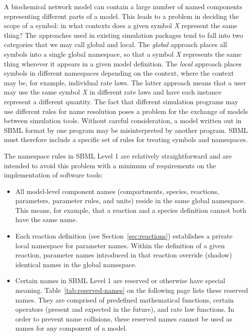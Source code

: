 \documentclass[10pt]{cekarticle}
\newcommand{\changed}[1]{\textcolor{BrickRed}{#1}}
\begin{document}
A biochemical network model can contain a large number of named components
representing different parts of a model.  This leads to a problem in
deciding the scope of a symbol: in what contexts does a given symbol
\emph{X} represent the same thing?  The approaches used in existing
simulation packages tend to fall into two categories that we may call
global and local.  The \emph{global} approach places all symbols into a
single global namespace, so that a symbol \emph{X} represents the same
thing wherever it appears in a given model definition.  The \emph{local}
approach places symbols in different namespaces depending on the context,
where the context may be, for example, individual rate laws.  The latter
approach means that a user may use the same symbol \emph{X} in different
rate laws and have each instance represent a different quantity.  The fact
that different simulation programs may use different rules for name
resolution poses a problem for the exchange of models between simulation
tools.  Without careful consideration, a model written out in SBML format
by one program may be misinterpreted by another program.  SBML must
therefore include a specific set of rules for treating symbols and
namespaces.

The namespace rules in SBML Level 1 are relatively straightforward and are
intended to avoid this problem with a minimum of requirements on the
implementation of software tools:
\begin{itemize}
  
\item All model-level component names (compartments, species, reactions,
  parameters, parameter rules, and units) reside in the same global
  namespace.  This means, for example, that a reaction and a
  \changed{species} definition cannot both have the same name.
  
\item Each reaction definition (see Section~\ref{sec:reactions})
  establishes a private local namespace for parameter names.  Within the
  definition of a given reaction, parameter names introduced in that
  reaction override (shadow) identical names in the global namespace.
  
\item Certain names in SBML Level 1 are reserved or otherwise have special
  meaning.  Table~\ref{tab:reserved-names} on the following page lists
  these reserved names.  They are comprised of predefined mathematical
  functions, certain operators (present and expected in the future), and
  rate law functions.  In order to prevent name collisions, these reserved
  names cannot be used as names for any component of a model.

\end{itemize}  
\end{document}
